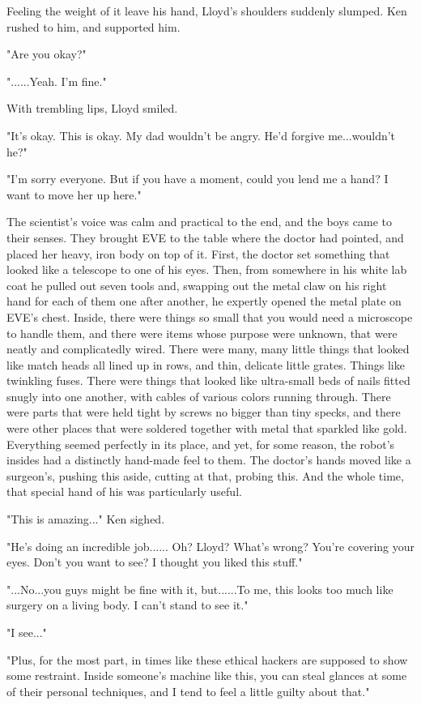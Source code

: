 \documentclass[
]{article}
\begin{document}
Feeling the weight of it leave his hand, Lloyd's shoulders suddenly
slumped. Ken rushed to him, and supported him.

"Are you okay?"

"......Yeah. I'm fine."

With trembling lips, Lloyd smiled.

"It's okay. This is okay. My dad wouldn't be angry. He'd forgive
me...wouldn't he?"

"I'm sorry everyone. But if you have a moment, could you lend me a hand?
I want to move her up here."

The scientist's voice was calm and practical to the end, and the boys
came to their senses. They brought EVE to the table where the doctor had
pointed, and placed her heavy, iron body on top of it. First, the doctor
set something that looked like a telescope to one of his eyes. Then,
from somewhere in his white lab coat he pulled out seven tools and,
swapping out the metal claw on his right hand for each of them one after
another, he expertly opened the metal plate on EVE's chest. Inside,
there were things so small that you would need a microscope to handle
them, and there were items whose purpose were unknown, that were neatly
and complicatedly wired. There were many, many little things that looked
like match heads all lined up in rows, and thin, delicate little grates.
Things like twinkling fuses. There were things that looked like
ultra-small beds of nails fitted snugly into one another, with cables of
various colors running through. There were parts that were held tight by
screws no bigger than tiny specks, and there were other places that were
soldered together with metal that sparkled like gold. Everything seemed
perfectly in its place, and yet, for some reason, the robot's insides
had a distinctly hand-made feel to them. The doctor's hands moved like a
surgeon's, pushing this aside, cutting at that, probing this. And the
whole time, that special hand of his was particularly useful.

"This is amazing..." Ken sighed.

"He's doing an incredible job...... Oh? Lloyd? What's wrong? You're
covering your eyes. Don't you want to see? I thought you liked this
stuff."

"...No...you guys might be fine with it, but......To me, this looks too
much like surgery on a living body. I can't stand to see it."

"I see..."

"Plus, for the most part, in times like these ethical hackers are
supposed to show some restraint. Inside someone's machine like this, you
can steal glances at some of their personal techniques, and I tend to
feel a little guilty about that."
\end{document}
